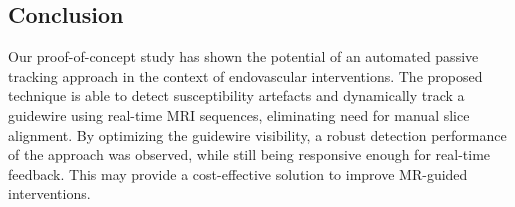 \documentclass[conference]{IEEEtran}
\begin{document}
\subsection{Conclusion}
Our proof-of-concept study has shown the potential of an automated passive tracking approach in the context of endovascular interventions. The proposed technique is able to detect susceptibility artefacts and dynamically track a guidewire using real-time MRI sequences, eliminating need for manual slice alignment. By optimizing the guidewire visibility, a robust detection performance of the approach was observed, while still being responsive enough for real-time feedback. This may provide a cost-effective solution to improve MR-guided interventions.



\vspace{12pt}
\end{document}
